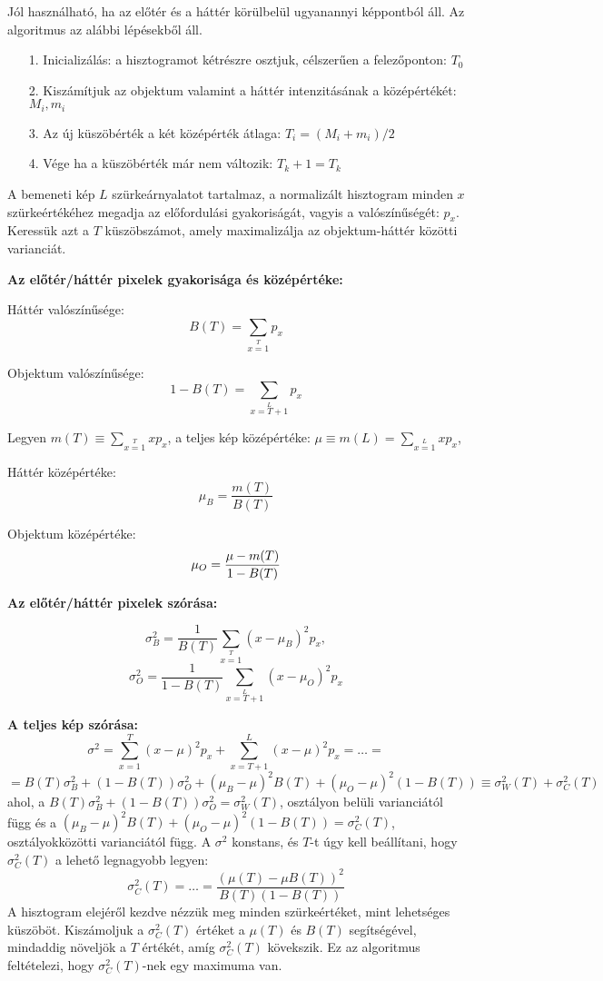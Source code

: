 

Jól használható, ha az előtér és a háttér körülbelül ugyanannyi képpontból áll. Az algoritmus az alábbi lépésekből áll.
\begin{itemize}
\item[1.] Inicializálás: a hisztogramot kétrészre osztjuk, célszerűen a felezőponton: $T_0$
\item[2.] Kiszámítjuk az objektum valamint a háttér intenzitásának a középértékét: $M_i, m_i$
\item[3.] Az új küszöbérték a két középérték átlaga: $T_i=(M_i+m_i)/2$
\item[4.] Vége ha a küszöbérték már nem változik: $T_k+1=T_k$
\end{itemize}



A bemeneti kép $L$ szürkeárnyalatot tartalmaz, a normalizált hisztogram minden $x$ szürkeértékéhez megadja az előfordulási gyakoriságát, vagyis a valószínűségét: $p_x$. Keressük azt a $T$ küszöbszámot, amely maximalizálja az objektum-háttér közötti varianciát.

\textbf{Az előtér/háttér pixelek gyakorisága és középértéke:}

Háttér valószínűsége:
$$
B(T) = \sum\limits_{x=1}\limits^{T}p_x 
$$

Objektum valószínűsége:
$$
1-B(T)=\sum\limits_{x=T+1}\limits^{L}p_x
$$

Legyen $m(T)\equiv \sum\limits_{x=1}\limits^{T}xp_x$, a teljes kép középértéke: $\mu \equiv m(L) = \sum\limits_{x=1}\limits^{L}xp_x$,

Háttér középértéke:
$$
\mu_B =\frac{m(T)}{B(T)}
$$

Objektum középértéke:
$$
\mu_O =\frac{\mu-m(T)}{1-B(T)}\\
$$

\textbf{Az előtér/háttér pixelek szórása:}

$$
\sigma^2_B =
\frac{1}{B(T)}\sum\limits_{x=1}\limits^{T}(x-\mu_B)^2 p_x,
$$
$$
\sigma^2_O =
\frac{1}{1-B(T)}\sum\limits_{x=T+1}\limits^{L}(x-\mu_O)^2 p_x
$$

\textbf{A teljes kép szórása:}
$$
\sigma^2 =
\sum_{x=1}^T(x-\mu)^2 p_x + \sum_{x=T+1}^L(x-\mu)^2 p_x =
\dots =
$$
$$
= B(T)\sigma_B^2+(1-B(T))\sigma_O^2 + (\mu_B-\mu)^2B(T)+(\mu_O-\mu)^2(1-B(T)) \equiv \sigma^2_W(T)+\sigma^2_C(T)
$$
ahol, a $B(T)\sigma_B^2+(1-B(T))\sigma_O^2 = \sigma^2_W(T)$, osztályon belüli varianciától függ és a $(\mu_B-\mu)^2B(T)+(\mu_O-\mu)^2(1-B(T)) = \sigma^2_C(T)$, osztályokközötti varianciától függ. A $\sigma^2$ konstans, és $T$-t úgy kell beállítani, hogy $\sigma_C^2(T)$ a lehető legnagyobb legyen:
$$
\sigma^2_C(T) = \dots = \frac{(\mu(T)-\mu B(T))^2}{B(T)(1-B(T))}
$$
A hisztogram elejéről kezdve nézzük meg minden szürkeértéket, mint lehetséges küszöböt. Kiszámoljuk a $\sigma^2_C(T)$ értéket a $\mu(T)$ és $B(T)$  segítségével, mindaddig növeljök a $T$ értékét, amíg $\sigma^2_C(T)$ kövekszik. Ez az algoritmus feltételezi, hogy $\sigma^2_C(T)$-nek egy maximuma van.

